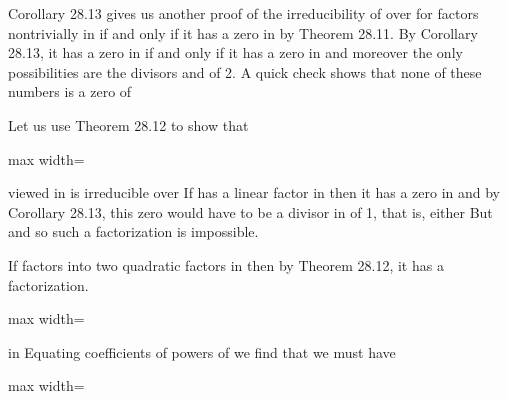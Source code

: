 \documentclass[11pt,oneside]{article}
\begin{document}
\begin{BookBody}

 Corollary 28.13 gives us another proof of the irreducibility of  over  for  factors nontrivially in  if and only if it has a zero in  by Theorem 28.11. By Corollary 28.13, it has a zero in  if and only if it has a zero in  and moreover the only possibilities are the divisors  and  of 2. A quick check shows that none of these numbers is a zero of \BookEnd{\blacktriangle}

 Let us use Theorem 28.12 to show that

\begin{center}\begin{adjustbox}{max width=\linewidth}\end{adjustbox}\end{center}

\noindent viewed in  is irreducible over  If  has a linear factor in  then it has a zero in  and by Corollary 28.13, this zero would have to be a divisor in  of 1, that is, either  But  and  so such a factorization is impossible.

If  factors into two quadratic factors in  then by Theorem 28.12, it has a factorization.

\begin{center}\begin{adjustbox}{max width=\linewidth}\end{adjustbox}\end{center}

\noindent in  Equating coefficients of powers of  we find that we must have

\begin{center}\begin{adjustbox}{max width=\linewidth}\end{adjustbox}\end{center}


\end{BookBody}
\end{document}
